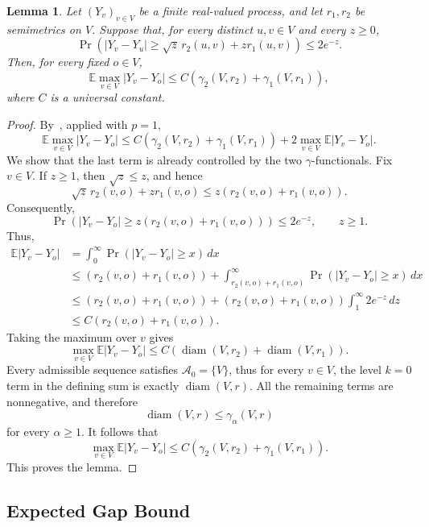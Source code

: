 \documentclass[11pt]{article}
\numberwithin{equation}{section}
\newtheorem{lemma}[theorem]{Lemma}
\newcommand{\E}{\mathbb{E}}
\newcommand{\1}{\mathbf{1}}
\begin{document}
\begin{lemma}
\label{lem:mixed-generic-chaining}
Let \((Y_v)_{v\in V}\) be a finite real-valued process, and let \(r_1,r_2\) be semimetrics on \(V\). Suppose that, for every distinct \(u,v\in V\) and every \(z\ge0\),
\[
\Pr\left(
|Y_v-Y_u|
\ge
\sqrt z\,r_2(u,v)+zr_1(u,v)
\right)
\le
2e^{-z}.
\]
Then, for every fixed \(o\in V\),
\[
\E\max_{v\in V}|Y_v-Y_o|
\le
C\left(
\gamma_2(V,r_2)+\gamma_1(V,r_1)
\right),
\]
where \(C\) is a universal constant.
\end{lemma}

\begin{proof}
By~\cite[Theorem~3.5]{DirksenGenericChaining}, applied with \(p=1\),
\[
\E\max_{v\in V}|Y_v-Y_o|
\le
C\left(
\gamma_2(V,r_2)+\gamma_1(V,r_1)
\right)
+
2\max_{v\in V}\E|Y_v-Y_o|.
\]
We show that the last term is already controlled by the two \(\gamma\)-functionals.
Fix \(v\in V\). If \(z\ge1\), then \(\sqrt z\le z\), and hence
\[
\sqrt z\,r_2(v,o)+zr_1(v,o)
\le
z(r_2(v,o)+r_1(v,o)).
\]
Consequently,
\[
\Pr\left(
|Y_v-Y_o|
\ge
z(r_2(v,o)+r_1(v,o))
\right)
\le
2e^{-z},
\qquad z\ge1.
\]
Thus,
\[
\begin{aligned}
\E|Y_v-Y_o|
&=
\int_0^\infty
\Pr\left(
|Y_v-Y_o|\ge x
\right)\,dx\\
&\le
(r_2(v,o)+r_1(v,o))
+
\int_{r_2(v,o)+r_1(v,o)}^\infty
\Pr\left(
|Y_v-Y_o|\ge x
\right)\,dx\\
&\le
(r_2(v,o)+r_1(v,o))
+
(r_2(v,o)+r_1(v,o))\int_1^\infty2e^{-z}\,dz\\
&\le
C(r_2(v,o)+r_1(v,o)).
\end{aligned}
\]
Taking the maximum over \(v\) gives
\[
\max_{v\in V}\E|Y_v-Y_o|
\le
C\left(
\operatorname{diam}(V,r_2)
+
\operatorname{diam}(V,r_1)
\right).
\]
Every admissible sequence satisfies \(\mathcal A_0=\{V\}\), thus for every \(v\in V\), the level \(k=0\) term in the defining sum is exactly \(\operatorname{diam}(V,r).\)
All the remaining terms are nonnegative, and therefore
\[
\operatorname{diam}(V,r)
\le
\gamma_\alpha(V,r)
\]
for every \(\alpha\ge1\). It follows that
\[
\max_{v\in V}\E|Y_v-Y_o|
\le
C\left(
\gamma_2(V,r_2)+\gamma_1(V,r_1)
\right).
\]
This proves the lemma.
\end{proof}

\subsection{Expected Gap Bound}\label{sec:2.3from2.2}
\end{document}
